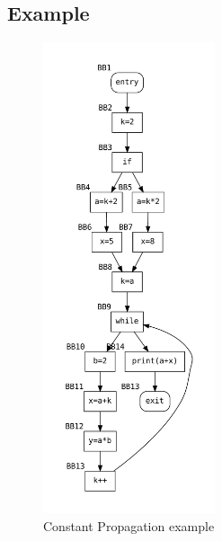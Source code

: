 \documentclass{article}
\begin{document}
\subsection{Example}

\begin{figure}[H]
    \centering
    \includegraphics[width=0.45\textwidth]{graphs/constant_propagation.pdf}
    \caption{Constant Propagation example}
    \label{fig:enter-label}
\end{figure}
\end{document}
